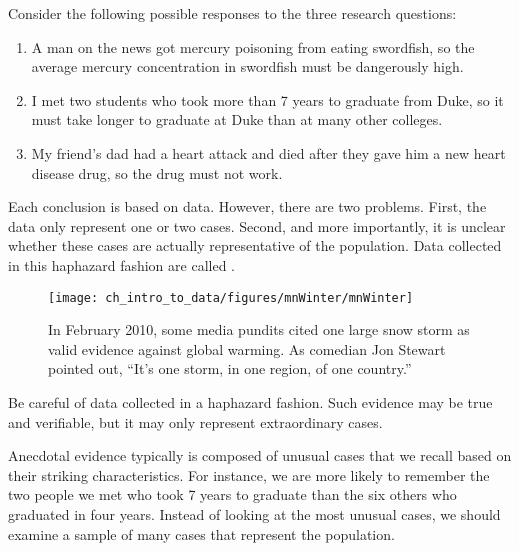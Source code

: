 Consider the following possible responses to the three research questions:
\begin{enumerate}
\item A man on the news got mercury poisoning from eating swordfish, so the average mercury concentration in swordfish must be dangerously high.
\item\label{iKnowThreeStudentsWhoTookMoreThan7YearsToGraduateAtDuke} I met two students who took more than 7 years to graduate from Duke, so it must take longer to graduate at Duke than at many other colleges.
\item\label{myFriendsDadDiedAfterSulphinpyrazon} My friend's dad had a heart attack and died after they gave him a new heart disease drug, so the drug must not work.
\end{enumerate}
Each conclusion is based on data. However, there are two problems. First, the data only represent one or two cases. Second, and more importantly, it is unclear whether these cases are actually representative of the population. Data collected in this haphazard fashion are called .

\setlength{\captionwidth}{\textwidth-80mm}
\begin{figure}
\centering
\hspace{8mm}\texttt{[image: ch\_intro\_to\_data/figures/mnWinter/mnWinter]}\hspace{4mm}
\begin{minipage}[b]{\textwidth - 80mm}
   \caption[anecdotal evidence]{In February 2010, some media pundits cited one large snow storm as valid evidence against global warming. As comedian Jon Stewart pointed out, ``It's one storm, in one region, of one country.''
   \label{mnWinter}}
\end{minipage}
\end{figure}
\setlength{\captionwidth}{\mycaptionwidth}

\begin{termBox}{
Be careful of data collected in a haphazard fashion. Such evidence may be true and verifiable, but it may only represent extraordinary cases.}
\end{termBox}

Anecdotal evidence typically is composed of unusual cases that we recall based on their striking characteristics. For instance, we are more likely to remember the two people we met who took 7 years to graduate than the six others who graduated in four years. Instead of looking at the most unusual cases, we should examine a sample of many cases that represent the population.

